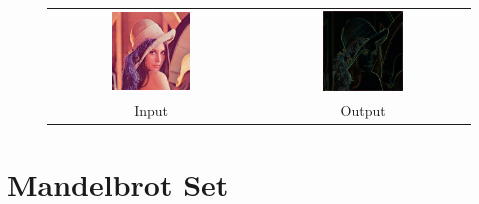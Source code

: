 \documentclass{beamer}
\begin{document}
\begin{frame}
\begin{figure}\centering
\begin{tabular}{cc}
\includegraphics[width=0.4\textwidth]{examples/reduce/lena} &
\includegraphics[width=0.4\textwidth]{examples/reduce/output_example4} \\
Input & Output
\end{tabular}
\end{figure}
\end{frame}


\section{Mandelbrot Set} %

\begin{frame}
%
%

\end{frame}

\begin{frame}

\end{frame}
\end{document}
